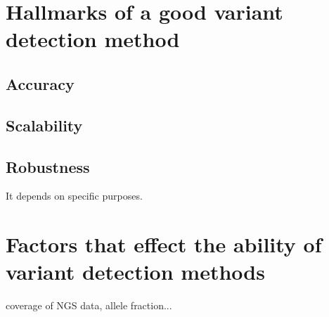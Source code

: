 \documentclass[11pt,reqno]{amsart}
\begin{document}

\section{Hallmarks of a good variant detection method}
\subsection{Accuracy}
\subsection{Scalability}
\subsection{Robustness}

It depends on specific purposes.

\section{Factors that effect the ability of variant detection methods}
coverage of NGS data, allele fraction...
\end{document}
